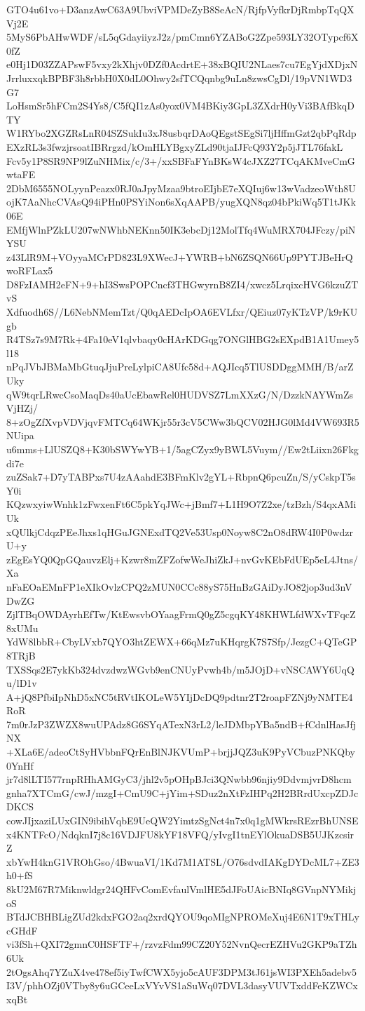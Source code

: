 GTO4u61vo+D3anzAwC63A9UbviVPMDeZyB8SeAcN/RjfpVyfkrDjRmbpTqQXVj2E
5MyS6PbAHwWDF/sL5qGdayiiyzJ2z/pmCmn6YZABoG2Zpe593LY32OTypcf6X0fZ
e0Hj1D03ZZAPswF5vxy2kXhjv0DZf0AcdrtE+38xBQIU2NLaes7cu7EgYjdXDjxN
JrrluxxqkBPBF3h8rbbH0X0dL0Ohwy2sfTCQqnbg9uLn8zwsCgDl/19pVN1WD3G7
LoHsmSr5hFCm2S4Ys8/C5fQI1zAs0yox0VM4BKiy3GpL3ZXdrH0yVi3BAfBkqDTY
W1RYbo2XGZRsLnR04SZSukIu3xJ8usbqrDAoQEgstSEgSi7ljHffmGzt2qbPqRdp
EXzRL3s3fwzjrsoatIBRrgzd/kOmHLYBgxyZLd90tjaIJFcQ93Y2p5jJTL76fakL
Fcv5y1P8SR9NP9lZuNHMix/c/3+/xxSBFaFYnBKsW4cJXZ27TCqAKMveCmGwtaFE
2DbM6555NOLyynPeazx0RJ0aJpyMzaa9btroEIjbE7eXQIuj6w13wVadzeoWth8U
ojK7AaNhcCVAsQ94iPHn0PSYiNon6sXqAAPB/yugXQN8qz04bPkiWq5T1tJKk06E
EMfjWlnPZkLU207wNWhbNEKnn50IK3ebcDj12MolTfq4WuMRX704JFczy/piNYSU
z43LlR9M+VOyyaMCrPD823L9XWecJ+YWRB+bN6ZSQN66Up9PYTJBeHrQwoRFLax5
D8FzIAMH2eFN+9+hI3SwsPOPCncf3THGwyrnB8ZI4/xwcz5LrqixcHVG6kzuZTvS
Xdfuodh6S//L6NebNMemTzt/Q0qAEDcIpOA6EVLfxr/QEiuz07yKTzVP/k9rKUgb
R4TSz7s9M7Rk+4Fa10eV1qlvbaqy0cHArKDGqg7ONGlHBG2sEXpdB1A1Umey5l18
nPqJVbJBMaMbGtuqJjuPreLylpiCA8Ufc58d+AQJIcq5TlUSDDggMMH/B/arZUky
qW9tqrLRwcCsoMaqDs40aUcEbawRel0HUDVSZ7LmXXzG/N/DzzkNAYWmZsVjHZj/
8+zOgZfXvpVDVjqvFMTCq64WKjr55r3cV5CWw3bQCV02HJG0lMd4VW693R5NUipa
u6mms+LlUSZQ8+K30bSWYwYB+1/5agCZyx9yBWL5Vuym//Ew2tLiixn26Fkgdi7e
zuZSak7+D7yTABPxs7U4zAAahdE3BFmKlv2gYL+RbpnQ6pcuZn/S/yCskpT5sY0i
KQzwxyiwWnhk1zFwxenFt6C5pkYqJWc+jBmf7+L1H9O7Z2xe/tzBzh/S4qxAMiUk
xQUlkjCdqzPEeJhxs1qHGuJGNExdTQ2Ve53Usp0Noyw8C2nO8dRW4I0P0wdzrU+y
zEgEsYQ0QpGQauvzElj+Kzwr8mZFZofwWeJhiZkJ+nvGvKEbFdUEp5eL4Jtns/Xa
nFaEOaEMnFP1eXIkOvlzCPQ2zMUN0CCc88yS75HnBzGAiDyJO82jop3ud3nVDwZG
ZjlTBqOWDAyrhEfTw/KtEwsvbOYaagFrmQ0gZ5cgqKY48KHWLfdWXvTFqcZ8xUMu
YdW8lbbR+CbyLVxb7QYO3htZEWX+66qMz7uKHqrgK7S7Sfp/JezgC+QTeGP8TRjB
TXSSqs2E7ykKb324dvzdwzWGvb9enCNUyPvwh4b/m5JOjD+vNSCAWY6UqQu/lD1v
A+jQ8PfbiIpNhD5xNC5tRVtIKOLeW5YIjDcDQ9pdtnr2T2roapFZNj9yNMTE4RoR
7m0rJzP3ZWZX8wuUPAdz8G6SYqATexN3rL2/leJDMbpYBa5ndB+fCdnlHasJfjNX
+XLa6E/adeoCtSyHVbbnFQrEnBlNJKVUmP+brjjJQZ3uK9PyVCbuzPNKQby0YnHf
jr7d8lLTI577rnpRHhAMGyC3/jhl2v5pOHpBJci3QNwbb96njiy9DdvmjvrD8hcm
gnha7XTCmG/cwJ/mzgI+CmU9C+jYim+SDuz2nXtFzIHPq2H2BRrdUxcpZDJcDKCS
cowJIjxaziLUxGIN9ibihVqbE9UeQW2YimtzSgNct4n7x0q1gMWkrsREzrBhUNSE
x4KNTFcO/NdqknI7j8c16VDJFU8kYF18VFQ/yIvgI1tnEYlOkuaDSB5UJKzcsirZ
xbYwH4knG1VROhGso/4BwuaVI/1Kd7M1ATSL/O76sdvdIAKgDYDcML7+ZE3h0+fS
8kU2M67R7Miknwldgr24QHFvComEvfaulVmlHE5dJFoUAicBNIq8GVnpNYMikjoS
BTdJCBHBLigZUd2kdxFGO2aq2xrdQYOU9qoMIgNPROMeXuj4E6N1T9xTHLycGHdF
vi3fSh+QXI72gmnC0HSFTF+/rzvzFdm99CZ20Y52NvnQecrEZHVu2GKP9aTZh6Uk
2tOgsAhq7YZuX4ve478ef5iyTwfCWX5yjo5cAUF3DPM3tJ61jsWI3PXEh5adebv5
I3V/phhOZj0VTby8y6uGCeeLxVYvVS1aSuWq07DVL3dasyVUVTxddFeKZWCxxqBt
